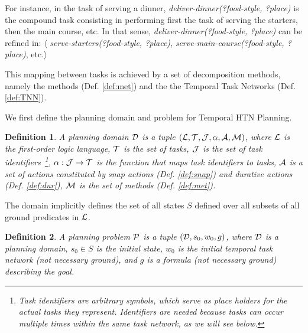 \documentclass[letterpaper]{article} %
\newtheorem{definition}{Definition}
\begin{document}
 For instance, in the task of serving a dinner, {\it deliver-dinner(?food-style, ?place)} is the compound task consisting in performing first the task of serving the starters, then the main course, etc. In that sense,  {\it deliver-dinner(?food-style, ?place)} can be refined in: $\langle$ {\it serve-starters(?food-style, ?place)},  {\it serve-main-course(?food-style, ?place)}, etc.$\rangle$

 This mapping between tasks is achieved by a set of decomposition methods, namely the methods (Def. \ref{def:met}) and the the Temporal Task Networks (Def. \ref{def:TNN}).%

 

 We first define the planning domain and problem for Temporal HTN Planning.
 \begin{definition}
   A \emph{planning domain} $\cal{D}$ is a tuple $({\cal{L}}, {\cal{T}}, {\cal{J}}, \alpha, {\cal{A}}, {\cal{M}})$, where
   $\cal{L}$ is the first-order logic language,
   $\cal{T}$ is the set of tasks,
   $\cal{J}$ is the set of task identifiers~\footnote{Task identifiers are arbitrary symbols, which serve as place holders for the actual tasks they represent. Identifiers are needed because tasks can occur multiple times within the same task network, as we will see below.},
   $\alpha: {\cal{J}} \rightarrow {\cal{T}}$ is the function that maps task identifiers to tasks,
   ${\cal{A}}$ is a set of actions constituted by \emph{snap} actions (Def. \ref{def:snap}) and \emph{durative} actions (Def. \ref{def:dur}),
   $\cal{M}$ is the set of methods (Def. \ref{def:met}). %
 \end{definition}

 The domain implicitly defines the set of all states $S$ defined over all subsets of all ground predicates in $\cal{L}$.

 \begin{definition}
 A \emph{planning problem} $\cal{P}$ is a tuple $({\cal{D}}, {s_0}, w_0, g)$, where $\cal{D}$ is a planning domain, $s_0 \in S$ is the initial state, $w_0$ is the initial temporal task network (not necessary ground), and $g$ is a formula (not necessary ground) describing the goal.
 \end{definition}
\end{document}
